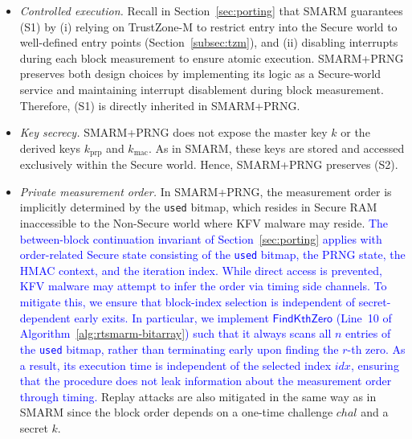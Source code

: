 \documentclass[journal]{IEEEtran}
\newcommand\ben[1]{\textcolor{blue}{#1}}
\newcommand{\rtsmarmone}{SMARM+PRNG\xspace}
\newcommand{\rtsmarmtwo}{SMARM+FPE\xspace}
\begin{document}
\begin{itemize}
  \item[(S1)] \emph{Controlled execution.}
  Recall in Section~\ref{sec:porting} that SMARM guarantees (S1) by (i) relying on TrustZone-M to restrict entry into the Secure world to well-defined entry points (Section~\ref{subsec:tzm}), and (ii) disabling interrupts during each block measurement to ensure atomic execution.
  \rtsmarmone preserves both design choices by implementing its logic as a Secure-world service and maintaining interrupt disablement during block measurement.
  Therefore, (S1) is directly inherited in \rtsmarmone.

  \item[(S2)] \emph{Key secrecy.}
  \rtsmarmone does not expose the master key $k$ or the derived keys $k_{\mathrm{prp}}$ and $k_{\mathrm{mac}}$.
  As in SMARM, these keys are stored and accessed exclusively within the Secure world.
  Hence, \rtsmarmone preserves (S2).

  \item[(S3)] \emph{Private measurement order.}
  In \rtsmarmone, the measurement order is implicitly determined by the \texttt{used} bitmap, which resides in Secure RAM inaccessible to the Non-Secure world where KFV malware may reside.
  \ben{The between-block continuation invariant of Section~\ref{sec:porting} applies with order-related Secure state consisting of the \texttt{used} bitmap, the PRNG state, the HMAC context, and the iteration index.}
  \ben{While direct access is prevented, KFV malware may attempt to infer the order via timing side channels.
  To mitigate this, we ensure that block-index selection is independent of secret-dependent early exits.
  In particular, we implement $\mathsf{FindKthZero}$ (Line~10 of Algorithm~\ref{alg:rtsmarm-bitarray}) such that it always scans all $n$ entries of the \texttt{used} bitmap, rather than terminating early upon finding the $r$-th zero.
  As a result, its execution time is independent of the selected index $idx$, ensuring that the procedure does not leak information about the measurement order through timing.}
  Replay attacks are also mitigated in the same way as in SMARM since the block order depends on a one-time challenge $chal$ and a secret $k$.
\end{itemize}



\end{document}
